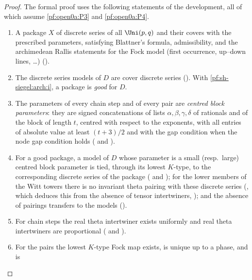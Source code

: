 \begin{proof}
The formal proof uses the following statements of the development, all of which assume \ref{pf:open0a:P3} and
\ref{pf:open0a:P4}.
\begin{enumerate}[label=(\roman*)]
\item\label{pf:sh-siegel:arch:i} A package $X$ of discrete series of all $\Uni(p,q)$ and their covers with the
prescribed parameters, satisfying Blattner's formula, admissibility, and the archimedean Rallis statements for the Fock
model (first occurrence, up--down lines, \dots) ().
\item\label{pf:sh-siegel:arch:ii} The discrete series models of $D$ are cover discrete series
(). With
\ref{pf:sh-siegel:arch:i}, a package is \emph{good} for $D$.
\item\label{pf:sh-siegel:arch:iii} The parameters of every chain step and of every pair are \emph{centred block
parameters}: they are signed concatenations of lists $\alpha,\beta,\gamma,\delta$ of rationals and of the block of
length $t$, centred with respect to the exponents, with all entries of absolute value at least $(t+3)/2$ and with the
gap condition when the node gap condition holds
( and ).
\item\label{pf:sh-siegel:arch:iv} For a good package, a model of $D$ whose parameter is a small (resp.\ large) centred
block parameter is tied, through its lowest $K$-type, to the corresponding discrete series of the package
( and ); for the lower members of the Witt towers
there is no invariant theta pairing with these discrete series
(, which deduces this from the absence of
tensor intertwiners, ); and the absence of pairings
transfers to the models ().
\item\label{pf:sh-siegel:arch:v} For chain steps the real theta intertwiner exists uniformly and real theta intertwiners
are proportional ( and ).
\item\label{pf:sh-siegel:arch:vi} For the pairs the lowest $K$-type Fock map exists, is unique up to a phase, and is

\end{enumerate}
\end{proof}
